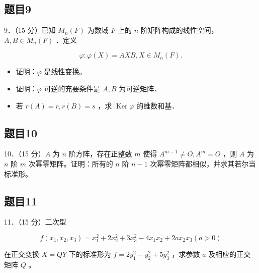 \documentclass{article}
\begin{document}
\subsection{题目9}
9．（15 分）已知 \(M_{n}(F)\) 为数域 \(F\) 上的 \(n\) 阶矩阵构成的线性空间，\(A, B \in M_{n}(F)\) ．定义

\[
\varphi: \varphi(X)=A X B, X \in M_{n}(F) .
\]

\begin{itemize}
  \item[（1）] 证明：\(\varphi\) 是线性变换。
  \item[（2）] 证明：\(\varphi\) 可逆的充要条件是 \(A, B\) 为可逆矩阵．
  \item[（3）] 若 \(r(A)=r, r(B)=s\) ，求 \(\operatorname{Ker} \varphi\) 的维数和基．
\end{itemize}

\subsection{题目10}
10．（15 分）\(A\) 为 \(n\) 阶方阵，存在正整数 \(m\) 使得 \(A^{m-1} \neq O, A^{m}=O\) ，则 \(A\) 为 \(n\) 阶 \(m\) 次幂零矩阵。证明：所有的 \(n\) 阶 \(n-1\) 次幂零矩阵都相似，并求其若尔当标准形。

\subsection{题目11}
11．（15 分）二次型

\[
f\left(x_{1}, x_{2}, x_{3}\right)=x_{1}^{2}+2 x_{2}^{2}+3 x_{3}^{2}-4 x_{1} x_{2}+2 a x_{2} x_{3}(a>0)
\]

在正交变换 \(X=Q Y\) 下的标准形为 \(f=2 y_{1}^{2}-y_{2}^{2}+5 y_{3}^{2}\) ，求参数 \(a\) 及相应的正交矩阵 \(Q\) 。
\end{document}
